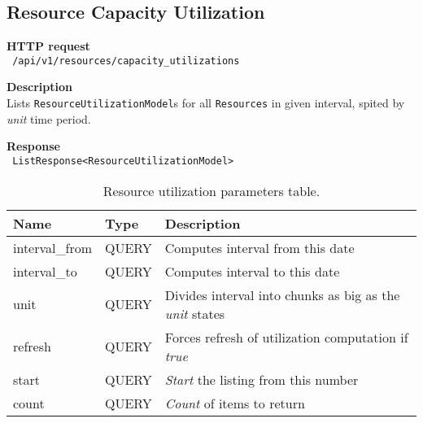 \subsection{Resource Capacity Utilization}
\begin{description}
    \item \textbf{HTTP request}\\
        \texttt{\text{[GET]} /api/v1/resources/capacity\_utilizations}
    \item \textbf{Description}\\
        Lists \texttt{ResourceUtilizationModel}s for all \texttt{Resources} in given interval, spited by \emph{unit} time period.
    \item \textbf{Response}\\
        \texttt{\text{[200 OK]} ListResponse<ResourceUtilizationModel>}
\end{description}
\begin{table}[ht!]
    \begin{tabularx}{\textwidth}{llX}
        \toprule
        Name & Type & Description \\
        \midrule
        interval\_from & QUERY & Computes interval from this date \\  
        interval\_to & QUERY & Computes interval to this date \\
        unit & QUERY & Divides interval into chunks as big as the \emph{unit} states \\
        refresh & QUERY & Forces refresh of utilization computation if \emph{true} \\
        start & QUERY & \emph{Start} the listing from this number \\  
        count & QUERY & \emph{Count} of items to return
        \end{tabularx}
    \caption{Resource utilization parameters table.}
\end{table}

